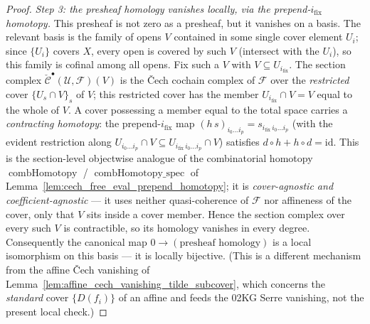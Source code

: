 \begin{proof}
  \emph{Step 3: the presheaf homology vanishes locally, via the prepend-\(i_{\mathrm{fix}}\) homotopy.}
  This presheaf is not zero as a presheaf, but it vanishes on a basis. The relevant basis is the family
  of opens \(V\) contained in some single cover element \(U_i\); since \(\{U_i\}\) covers \(X\), every
  open is covered by such \(V\) (intersect with the \(U_i\)), so this family is cofinal among all opens.
  Fix such a \(V\) with \(V \subseteq U_{i_{\mathrm{fix}}}\). The section complex
  \(\check{\mathcal{C}}^\bullet(\mathcal{U}, \mathcal{F})(V)\) is the {\v C}ech cochain complex of
  \(\mathcal{F}\) over the \emph{restricted} cover \(\{U_s \cap V\}_s\) of \(V\); this restricted cover
  has the member \(U_{i_{\mathrm{fix}}} \cap V = V\) equal to the whole of \(V\). A cover possessing a
  member equal to the total space carries a \emph{contracting homotopy}: the prepend-\(i_{\mathrm{fix}}\)
  map \((h\,s)_{i_0 \ldots i_p} = s_{i_{\mathrm{fix}}\, i_0 \ldots i_p}\) (with the evident
  restriction along \(U_{i_0 \ldots i_p} \cap V \subseteq U_{i_{\mathrm{fix}}\, i_0 \ldots i_p} \cap V\))
  satisfies \(d \circ h + h \circ d = \mathrm{id}\). This is the section-level objectwise analogue of the
  combinatorial homotopy \(\operatorname{combHomotopy}\) /
  \(\operatorname{combHomotopy\_spec}\) of Lemma~\ref{lem:cech_free_eval_prepend_homotopy}; it is
  \emph{cover-agnostic and coefficient-agnostic} --- it uses neither quasi-coherence of \(\mathcal{F}\)
  nor affineness of the cover, only that \(V\) sits inside a cover member. Hence the section complex over
  every such \(V\) is contractible, so its homology vanishes in every degree. Consequently the canonical
  map \(0 \to (\text{presheaf homology})\) is a local isomorphism on this basis --- it is locally
  bijective. (This is a different mechanism from the affine {\v C}ech vanishing of
  Lemma~\ref{lem:affine_cech_vanishing_tilde_subcover}, which concerns the \emph{standard} cover
  \(\{D(f_i)\}\) of an affine and feeds the 02KG Serre vanishing, not the present local check.)


\end{proof}

